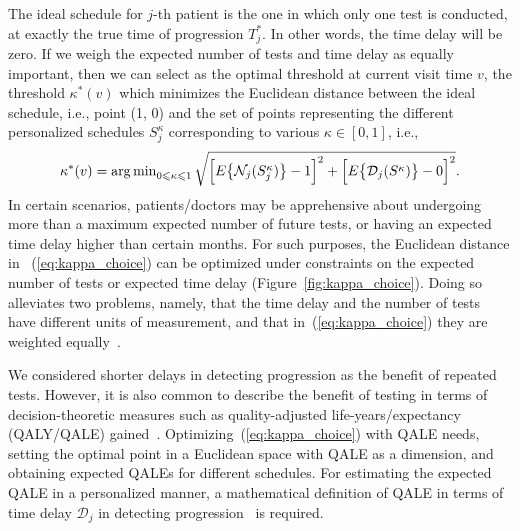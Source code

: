 The ideal schedule for $j$-th patient is the one in which only one test is conducted, at exactly the true time of progression $T^*_j$. In other words, the time delay will be zero. If we weigh the expected number of tests and time delay as equally important, then we can select as the optimal threshold at current visit time $v$, the threshold $\kappa^*(v)$ which minimizes the Euclidean distance between the ideal schedule, i.e., point (1, 0) and the set of points representing the different personalized schedules $S^{\kappa}_j$ corresponding to various $\kappa \in [0, 1]$, i.e.,
\begin{equation}
\label{eq:kappa_choice}
\kappa^*(v) = \argmin_{0 \leq \kappa \leq 1} \sqrt{\Big[E\big\{\mathcal N_j(S^\kappa_j)\big\} - 1\Big]^2 + \Big[E\big\{\mathcal D_j(S^\kappa )\big\} - 0\Big]^2}.
\end{equation}
In certain scenarios, patients/doctors may be apprehensive about undergoing more than a maximum expected number of future tests, or having an expected time delay higher than certain months. For such purposes, the Euclidean distance in ~(\ref{eq:kappa_choice}) can be optimized under constraints on the expected number of tests or expected time delay (Figure~\ref{fig:kappa_choice}). Doing so alleviates two problems, namely, that the time delay and the number of tests have different units of measurement, and that in~(\ref{eq:kappa_choice}) they are weighted equally~\citep{cook1994equivalence}.

We considered shorter delays in detecting progression as the benefit of repeated tests. However, it is also common to describe the benefit of testing in terms of decision-theoretic measures such as quality-adjusted life-years/expectancy (QALY/QALE) gained~\citep{sassi2006calculating}. Optimizing~(\ref{eq:kappa_choice}) with QALE needs, setting the optimal point in a Euclidean space with QALE as a dimension, and obtaining expected QALEs for different schedules. For estimating the expected QALE in a personalized manner, a mathematical definition of QALE in terms of time delay $\mathcal{D}_j$ in detecting progression~\citep{de2017should} is required.
